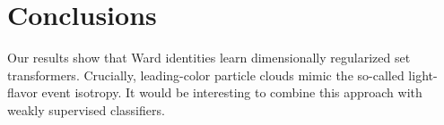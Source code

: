 \section{Conclusions}\label{sec:conclusions}

Our results show that Ward identities learn dimensionally regularized
set transformers. Crucially, leading-color particle clouds mimic the
so-called light-flavor event isotropy. It would be interesting to
combine this approach with weakly supervised classifiers.

